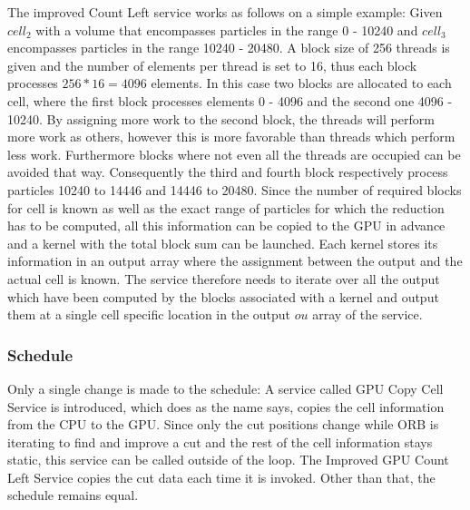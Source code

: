 \documentclass[]{article}
\begin{document}
The improved Count Left service works as follows on a simple example: Given $cell_2$ with a volume that encompasses particles in the range 0 - 10240 and $cell_3$ encompasses particles in the range 10240 - 20480.  A block size of 256 threads is given and the number of elements per thread is set to 16, thus each block processes $256 * 16 = 4096$ elements. In this case two blocks are allocated to each cell, where the first block processes elements 0 - 4096 and the second one 4096 - 10240. By assigning more work to the second block, the threads will perform more work as others, however this is more favorable than threads which perform less work. Furthermore blocks where not even all the threads are occupied can be avoided that way. Consequently the third and fourth block respectively process particles 10240 to 14446 and 14446 to 20480. Since the number of required blocks for cell is known as well as the exact range of particles for which the reduction has to be computed, all this information can be copied to the GPU in advance and a kernel with the total block sum can be launched. 
Each kernel stores its information in an output array where the assignment between the output and the actual cell is known. The service therefore needs to iterate over all the output which have been computed by the blocks associated with a kernel and output them at a single cell specific location in the output $ou$ array of the service.

\subsubsection{Schedule}

Only a single change is made to the schedule: A service called GPU Copy Cell Service is introduced, which does as the name says, copies the cell information from the CPU to the GPU. Since only the cut positions change while ORB is iterating to find and improve a cut and the rest of the cell information stays static, this service can be called outside of the loop. The Improved GPU Count Left Service copies the cut data each time it is invoked. Other than that, the schedule remains equal. 
\end{document}
